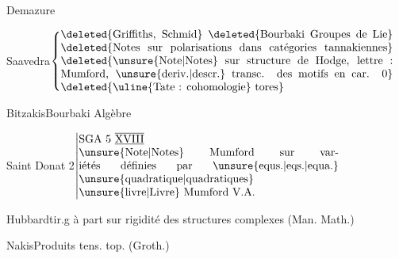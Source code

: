 








Demazure\qquad {}

Saavedra\quad \(\left\{\vcenter{\hbox{\begin{minipage}{.87\linewidth}
\deleted{Griffiths, Schmid}

\deleted{Bourbaki Groupes de Lie}

\deleted{Notes sur polarisations dans catégories tannakiennes}

\deleted{\unsure{Note|Notes} sur structure de Hodge, lettre : Mumford, \unsure{deriv.|descr.} transc. des motifs en car. 0}

\deleted{\uline{Tate : cohomologie} tores}
\end{minipage}}}\right.\)

Bitzakis\qquad Bourbaki Algèbre





Saint Donat 2\qquad \(\left\vert\begin{array}{@{}p{.68\linewidth}@{}}SGA 5 $\overline{\underline{\mathrm{XVIII}}}$\\\unsure{Note|Notes} Mumford sur variétés définies par \unsure{equs.|eqs.|equa.} \unsure{quadratique|quadratiques}\\\unsure{livre|Livre} Mumford V.A.\end{array}\right.\)

Hubbard\qquad tir.g à part sur rigidité des structures complexes (Man. Math.)

Nakis\qquad Produits tens. top. (Groth.)

\clearpage

